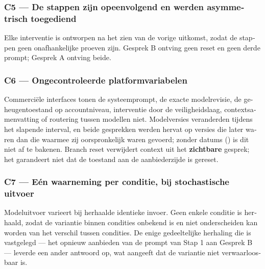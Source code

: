 \begin{dutch}
\subsubsection*{C5 — De stappen zijn opeenvolgend en werden asymmetrisch toegediend}
\label{sec:nl:x-c5-de-stappen-zijn-opeenvolgend-en-werde}

Elke interventie is ontworpen na het zien van de vorige uitkomst, zodat de stappen geen onafhankelijke proeven zijn. Gesprek B ontving geen reset en geen derde prompt; Gesprek A ontving beide.


\subsubsection*{C6 — Ongecontroleerde platformvariabelen}
\label{sec:nl:x-c6-ongecontroleerde-platformvariabelen}

Commerciële interfaces tonen de systeemprompt, de exacte modelrevisie, de geheugentoestand op accountniveau, interventie door de veiligheidslaag, contextsamenvatting of routering tussen modellen niet. Modelversies veranderden tijdens het slapende interval, en beide gesprekken werden hervat op versies die later waren dan die waarmee zij oorspronkelijk waren gevoerd; zonder datums () is dit niet af te bakenen. Branch reset verwijdert context uit het \textbf{zichtbare} gesprek; het garandeert niet dat de toestand aan de aanbiederzijde is gereset.


\subsubsection*{C7 — Eén waarneming per conditie, bij stochastische uitvoer}
\label{sec:nl:x-c7-e-n-waarneming-per-conditie-bij-stoch}

Modeluitvoer varieert bij herhaalde identieke invoer. Geen enkele conditie is herhaald, zodat de variantie binnen condities onbekend is en niet onderscheiden kan worden van het verschil tussen condities. De enige gedeeltelijke herhaling die is vastgelegd — het opnieuw aanbieden van de prompt van Stap 1 aan Gesprek B — leverde een ander antwoord op, wat aangeeft dat de variantie niet verwaarloosbaar is.



\end{dutch}
